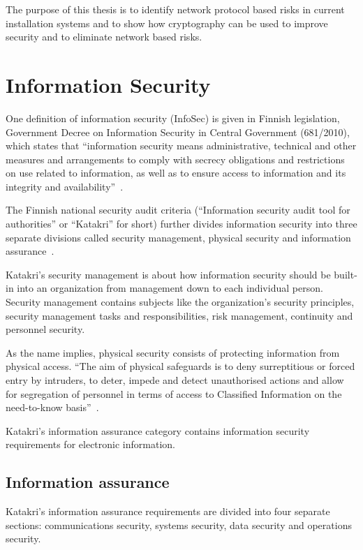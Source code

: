 The purpose of this thesis is to identify network protocol based risks
in current installation systems and to show how cryptography can be
used to improve security and to eliminate network based risks.


\section{Information Security}

One definition of information security (InfoSec) is given in Finnish
legislation, Government Decree on Information Security in Central
Government (681/2010), which states that ``information security means
administrative, technical and other measures and arrangements to
comply with secrecy obligations and restrictions on use related to
information, as well as to ensure access to information and its
integrity and availability''~\cite{finlex-infosec-in-gov}.

The Finnish national security audit criteria (``Information security
audit tool for authorities'' or ``Katakri'' for short) further divides
information security into three separate divisions called security
management, physical security and information
assurance~\cite{katakri}.

Katakri's security management is about how information security should
be built-in into an organization from management down to each
individual person. Security management contains subjects like the
organization's security principles, security management tasks and
responsibilities, risk management, continuity and personnel security.

As the name implies, physical security consists of protecting
information from physical access. ``The aim of physical safeguards is
to deny surreptitious or forced entry by intruders, to deter, impede
and detect unauthorised actions and allow for segregation of personnel
in terms of access to Classified Information on the need-to-know
basis''~\cite{katakri}.

Katakri's information assurance category contains information security
requirements for electronic information.


\subsection{Information assurance}

Katakri's information assurance requirements are divided into four
separate sections: communications security, systems security, data
security and operations security.

